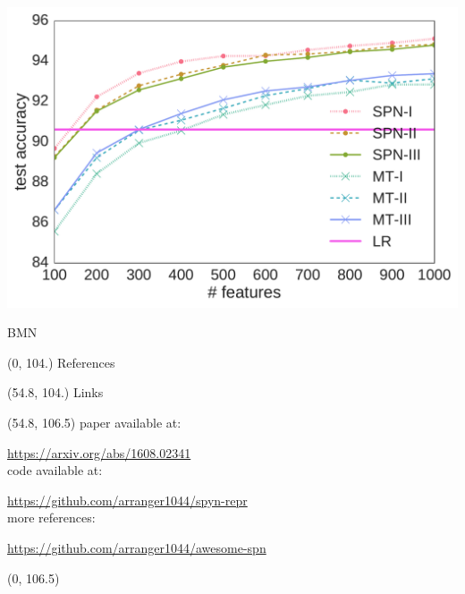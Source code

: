 \documentclass[final]{beamer}
\begin{document}
\begin{frame}{}
\begin{textblock}{80}
\begin{center}
\begin{minipage}[t]{0.2\linewidth}
\begin{center}
          \includegraphics[width=1.0\linewidth]{figures/lines-bmnist}\par
          \footnotesize\textsf{BMN}
        \end{center}
      \end{minipage}
    \end{center}
  \end{textblock}
  
  \begin{textblock}{80}(0, 104.)
    References
  \end{textblock}

  \begin{textblock}{80}(54.8, 104.)
    Links
  \end{textblock}

  \begin{textblock}{52}(54.8, 106.5)
    \small
    paper available at:\par
    \hspace{35pt}\url{https://arxiv.org/abs/1608.02341}\\
    code available at:\par
    \hspace{35pt}\url{https://github.com/arranger1044/spyn-repr}\\
    more references:\par
    \hspace{35pt}\url{https://github.com/arranger1044/awesome-spn}
  \end{textblock}
  
 \begin{textblock}{52}(0, 106.5)
    \small
    \setlength\bibitemsep{8pt}
    \printbibliography[heading=none]
  \end{textblock}
  

\end{frame}
\end{document}
